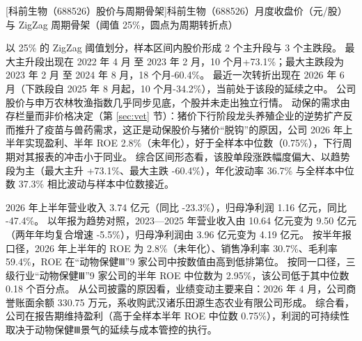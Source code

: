 \begin{center}
\begin{minipage}{\textwidth}\centering
{}

[科前生物（688526）股价与周期骨架]{科前生物（688526）月度收盘价（元/股）与 ZigZag 周期骨架（阈值 25\%，圆点为周期转折点）}
\end{minipage}
\end{center}

 以 25\% 的 ZigZag 阈值划分，样本区间内股价形成 2 个主升段与 3 个主跌段。 最大主升段出现在 2022 年 4 月 至 2023 年 2 月，10 个月+73.1\%；最大主跌段为 2023 年 2 月 至 2024 年 8 月，18 个月-60.4\%。 最近一次转折出现在 2026 年 6 月（下跌段自 2025 年 8 月起，10 个月-34.2\%），当前处于该段的延续之中。 公司股价与申万农林牧渔指数几乎同步见底，个股并未走出独立行情。 动保的需求由存栏量而非价格决定（第 \ref{sec:vet} 节）：猪价下行阶段龙头养殖企业的逆势扩产反而推升了疫苗与兽药需求，这正是动保股价与猪价“脱钩”的原因，公司 2026 年上半年实现盈利、半年 ROE 2.8\%（未年化），好于全样本中位数（0.75\%），下行周期对其报表的冲击小于同业。 综合区间形态看，该股单段涨跌幅度偏大、以趋势段为主（最大主升 +73.1\%、最大主跌 -60.4\%），年化波动率 36.7\% 与全样本中位数 37.3\% 相比波动与样本中位数接近。

 2026 年上半年营业收入 3.74 亿元（同比 -23.3\%），归母净利润 1.16 亿元，同比 -47.4\%。 以年报为趋势对照，2023---2025 年营业收入由 10.64 亿元变为 9.50 亿元（两年年均复合增速 -5.5\%），归母净利润由 3.96 亿元变为 4.19 亿元。 按半年报口径，2026 年上半年的 ROE 为 2.8\%（未年化）、销售净利率 30.7\%、毛利率 59.4\%，ROE 在“动物保健Ⅲ”9 家公司中按数值由高到低排第位。 按同一口径，三级行业“动物保健Ⅲ”9 家公司的半年 ROE 中位数为 2.95\%，该公司低于其中位数 0.18 个百分点。 从公司披露的原因看，业绩变动主要来自：2026 年 4 月，公司商誉账面余额 330.75 万元，系收购武汉诸乐田源生态农业有限公司形成。 综合看，公司在报告期维持盈利（高于全样本半年 ROE 中位数 0.75\%），利润的可持续性取决于动物保健Ⅲ景气的延续与成本管控的执行。

